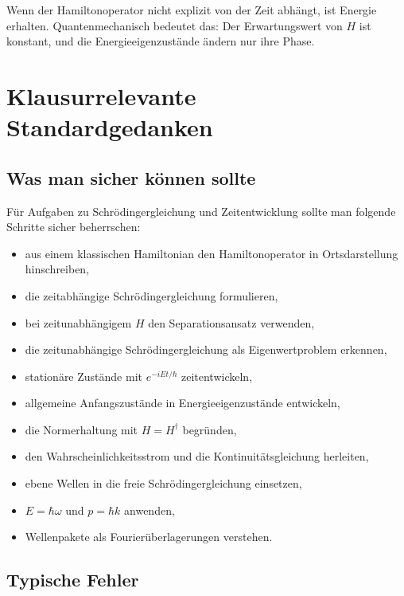\begin{conceptbox}
Wenn der Hamiltonoperator nicht explizit von der Zeit abhängt, ist Energie erhalten. Quantenmechanisch bedeutet das: Der Erwartungswert von $H$ ist konstant, und die Energieeigenzustände ändern nur ihre Phase.
\end{conceptbox}

\section{Klausurrelevante Standardgedanken}

\subsection{Was man sicher können sollte}

Für Aufgaben zu Schrödingergleichung und Zeitentwicklung sollte man folgende Schritte sicher beherrschen:
\begin{itemize}
    \item aus einem klassischen Hamiltonian den Hamiltonoperator in Ortsdarstellung hinschreiben,
    \item die zeitabhängige Schrödingergleichung formulieren,
    \item bei zeitunabhängigem $H$ den Separationsansatz verwenden,
    \item die zeitunabhängige Schrödingergleichung als Eigenwertproblem erkennen,
    \item stationäre Zustände mit $e^{-iEt/\hbar}$ zeitentwickeln,
    \item allgemeine Anfangszustände in Energieeigenzustände entwickeln,
    \item die Normerhaltung mit $H=H^\dagger$ begründen,
    \item den Wahrscheinlichkeitsstrom und die Kontinuitätsgleichung herleiten,
    \item ebene Wellen in die freie Schrödingergleichung einsetzen,
    \item $E=\hbar\omega$ und $p=\hbar k$ anwenden,
    \item Wellenpakete als Fourierüberlagerungen verstehen.
\end{itemize}

\subsection{Typische Fehler}

